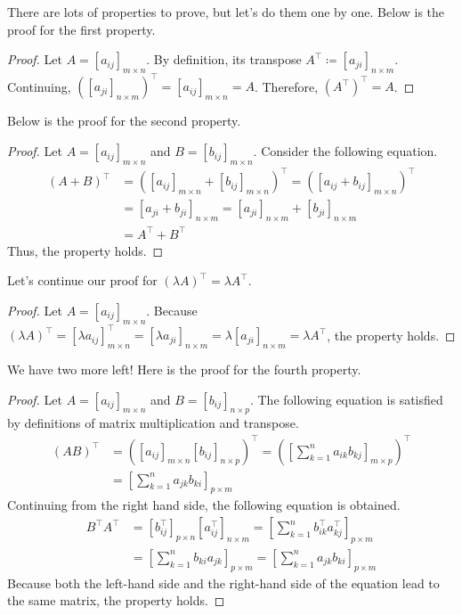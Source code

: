 \documentclass[../../main.tex]{subfiles}
\begin{document}
There are lots of properties to prove, but let's do them one by one.
Below is the proof for the first property.

\begin{proof}
Let $A = [a_{ij}]_{m \times n}$. By definition, its transpose
$A^\intercal \coloneqq [a_{ji}]_{n \times m}$. Continuing,
$\left( [a_{ji}]_{n \times m} \right)^\intercal =
[a_{ij}]_{m \times n} = A$. Therefore, $(A^\intercal)^\intercal = A$.
\end{proof}

Below is the proof for the second property.

\begin{proof}
Let $A = [a_{ij}]_{m \times n}$ and $B = [b_{ij}]_{m \times n}$.
Consider the following equation.
\begin{align*}
(A + B)^\intercal
&= \left(
    [a_{ij}]_{m \times n} + [b_{ij}]_{m \times n}
\right)^\intercal
= \left(
    [a_{ij} + b_{ij}]_{m \times n}
\right)^\intercal \\
&= [a_{ji} + b_{ji}]_{n \times m}
= [a_{ji}]_{n \times m} + [b_{ji}]_{n \times m} \\
&= A^\intercal + B^\intercal
\end{align*}
Thus, the property holds.
\end{proof}

Let's continue our proof for $(\lambda A)^\intercal =
\lambda A^\intercal$.

\begin{proof}
Let $A = [a_{ij}]_{m \times n}$. Because
$(\lambda A)^\intercal
= [\lambda a_{ij}]_{m \times n}^\intercal
= [\lambda a_{ji}]_{n \times m}
= \lambda [a_{ji}]_{n \times m}
= \lambda A^\intercal$, the property holds.
\end{proof}

We have two more left! Here is the proof for the fourth property.

\begin{proof}
Let $A = [a_{ij}]_{m \times n}$ and $B = [b_{ij}]_{n \times p}$.
The following equation is satisfied by definitions of matrix
multiplication and transpose.
\begin{align*}
    (AB)^\intercal
    &= \left(
        [a_{ij}]_{m \times n} [b_{ij}]_{n \times p}
    \right)^\intercal
    = \left(
        \left[ \sum_{k = 1}^{n} a_{ik} b_{kj} \right]_{m \times p}
    \right)^\intercal \\
    &= \left[ \sum_{k = 1}^{n} a_{jk} b_{ki} \right]_{p \times m}
\end{align*}
Continuing from the right hand side, the following equation is
obtained.
\begin{align*}
    B^\intercal A^\intercal
    &= \left[ b_{ij}^\intercal \right]_{p \times n}
        \left[ a_{ij}^\intercal \right]_{n \times m}
    = \left[
        \sum_{k = 1}^{n} b_{ik}^\intercal a_{kj}^\intercal
    \right]_{p \times m} \\
    &= \left[ \sum_{k = 1}^{n} b_{ki} a_{jk} \right]_{p \times m}
    = \left[ \sum_{k = 1}^{n} a_{jk} b_{ki} \right]_{p \times m}
\end{align*}
Because both the left-hand side and the right-hand side of the
equation lead to the same matrix, the property holds.
\end{proof}
\end{document}
